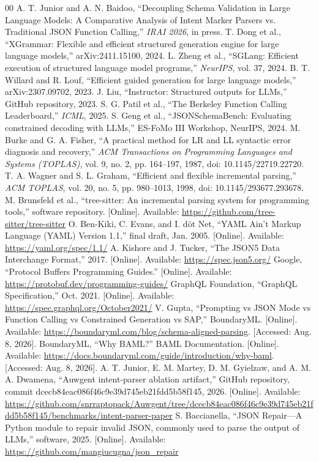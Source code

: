\documentclass[conference]{IEEEtran}
\begin{document}
\begin{thebibliography}{00}
 A. T. Junior and A. N. Baidoo, ``Decoupling Schema
Validation in Large Language Models: A Comparative Analysis of Intent
Marker Parsers vs. Traditional JSON Function Calling,'' \emph{IRAI 2026},
in press.
 T. Dong et al., ``XGrammar: Flexible and efficient
structured generation engine for large language models,''
arXiv:2411.15100, 2024.
 L. Zheng et al., ``SGLang: Efficient execution of
structured language model programs,'' \emph{NeurIPS}, vol. 37, 2024.
 B. T. Willard and R. Louf, ``Efficient guided
generation for large language models,'' arXiv:2307.09702, 2023.
 J. Liu, ``Instructor: Structured outputs for LLMs,''
GitHub repository, 2023.
 S. G. Patil et al., ``The Berkeley Function Calling
Leaderboard,'' \emph{ICML}, 2025.
 S. Geng et al., ``JSONSchemaBench: Evaluating
constrained decoding with LLMs,'' ES-FoMo III Workshop, NeurIPS, 2024.
 M. Burke and G. A. Fisher, ``A practical method for
LR and LL syntactic error diagnosis and recovery,'' \emph{ACM
Transactions on Programming Languages and Systems (TOPLAS)}, vol. 9,
no. 2, pp. 164--197, 1987, doi: 10.1145/22719.22720.
 T. A. Wagner and S. L. Graham, ``Efficient and
flexible incremental parsing,'' \emph{ACM TOPLAS}, vol. 20, no. 5,
pp. 980--1013, 1998, doi: 10.1145/293677.293678.
 M. Brunsfeld et al., ``tree-sitter: An incremental
parsing system for programming tools,'' software repository. [Online].
Available: \url{https://github.com/tree-sitter/tree-sitter}
 O. Ben-Kiki, C. Evans, and I. d\"ot Net, ``YAML Ain't
Markup Language (YAML) Version 1.1,'' final draft, Jan. 2005. [Online].
Available: \url{https://yaml.org/spec/1.1/}
 A. Kishore and J. Tucker, ``The JSON5 Data Interchange
Format,'' 2017. [Online]. Available: \url{https://spec.json5.org/}
 Google, ``Protocol Buffers Programming Guides.''
[Online]. Available: \url{https://protobuf.dev/programming-guides/}
 GraphQL Foundation, ``GraphQL Specification,''
Oct. 2021. [Online]. Available: \url{https://spec.graphql.org/October2021/}
 V. Gupta, ``Prompting vs JSON Mode vs Function Calling
vs Constrained Generation vs SAP,'' BoundaryML. [Online]. Available:
\url{https://boundaryml.com/blog/schema-aligned-parsing}. [Accessed: Aug. 8, 2026].
 BoundaryML, ``Why BAML?'' BAML Documentation. [Online].
Available: \url{https://docs.boundaryml.com/guide/introduction/why-baml}.
[Accessed: Aug. 8, 2026].
 A. T. Junior, E. M. Martey, D. M. Gyielzaw, and
A. M. A. Dwamena, ``Auwgent intent-parser ablation artifact,'' GitHub
repository, commit dcecb84eac086f46c9e39d745eb21fdd5b58f145, 2026.
[Online]. Available:
\url{https://github.com/snrraptopack/Auwgent/tree/dcecb84eac086f46c9e39d745eb21fdd5b58f145/benchmarks/intent-parser-paper}
 S. Baccianella, ``JSON Repair---A Python module to
repair invalid JSON, commonly used to parse the output of LLMs,'' software,
2025. [Online]. Available: \url{https://github.com/mangiucugna/json_repair}
\end{thebibliography}
\end{document}
